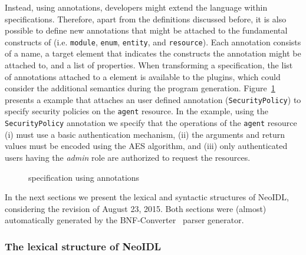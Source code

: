 Instead,
using annotations, developers might extend the language within \neoidl{}
specifications. Therefore, apart from the \neoidl{} definitions
discussed before, it is also possible to define new annotations that
might be attached to the fundamental constructs of \neoidl{} (i.e.
\texttt{module}, \texttt{enum}, \texttt{entity}, and
\texttt{resource}). Each annotation consists of a name, a target
element that indicates the \neoidl{} constructs the annotation 
might be attached to, and a list of properties. When transforming 
a specification, the list of annotations attached to a \neoidl{}
element is available to the plugins, which could consider the 
additional semantics during the program generation. Figure~\ref{lst:agent}
presents a \neoidl{} example that attaches an user defined
annotation (\texttt{SecurityPolicy}) to specify security policies 
on the \texttt{agent} resource. In the example, 
using the \texttt{SecurityPolicy} annotation we specify
that the operations of the \texttt{agent} resource
(i) must use a basic authentication mechanism, (ii)
the arguments and return values must be encoded using the
AES algorithm, and (iii) only authenticated users
having the \emph{admin} role are authorized to request the
resources. 

 
\begin{figure}
\begin{small}

\vspace{-.5cm}
\end{small}
\caption{\neoidl{} specification using annotations}
\label{lst:agent}
\end{figure}

In the next sections we present the lexical and 
syntactic structures of NeoIDL, considering 
the revision of August 23, 2015. Both sections 
were (almost) automatically generated by the BNF-Converter~\cite{forsberg-bnfc:2004} 
parser generator. 


\subsubsection{The lexical structure of NeoIDL}\label{sub:lexical}

